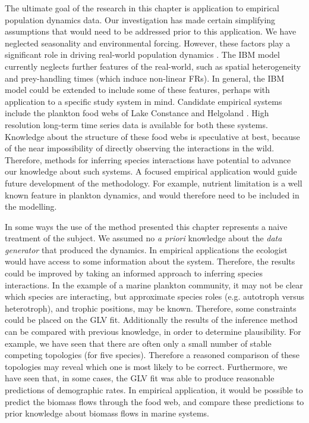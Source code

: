 The ultimate goal of the research in this chapter is application to empirical population dynamics data. Our investigation has made certain simplifying assumptions that would need to be addressed prior to this application. We have neglected seasonality and environmental forcing. However, these factors play a significant role in driving real-world population dynamics \cite{mutshinda2009drives}. The IBM model currently neglects further features of the real-world, such as spatial heterogeneity and prey-handling times (which induce non-linear FRs). In general, the IBM model could be extended to include some of these features, perhaps with application to a specific study system in mind. Candidate empirical systems include the plankton food webs of Lake Constance \cite{straile2000meteorological} and Helgoland \cite{wiltshire2010helgoland}. High resolution long-term time series data is available for both these systems. Knowledge about the structure of these food webs is speculative at best, because of the near impossibility of directly observing the interactions in the wild. Therefore, methods for inferring species interactions have potential to advance our knowledge about such systems. A focused empirical application would guide future development of the methodology. For example, nutrient limitation is a well known feature in plankton dynamics, and would therefore need to be included in the modelling.


In some ways the use of the method presented this chapter represents a naive treatment of the subject. We assumed no \emph{a priori} knowledge about the \emph{data generator} that produced the dynamics. In empirical applications the ecologist would have access to some information about the system. Therefore, the results could be improved by taking an informed approach to inferring species interactions. In the example of a marine plankton community, it may  not be clear which species are interacting, but approximate species roles (e.g. autotroph versus heterotroph), and trophic positions, may be known. Therefore, some constraints could be placed on the GLV fit. Additionally the results of the inference method can be compared with previous knowledge, in order to determine plausibility. For example, we have seen that there are often only a small number of stable competing topologies (for five species). Therefore a reasoned comparison of these topologies may reveal which one is most likely to be correct. Furthermore, we have seen that, in some cases, the GLV fit was able to produce reasonable predictions of demographic rates. In empirical application, it would be possible to predict the biomass flows through the food web, and compare these predictions to prior knowledge about biomass flows in marine systems.

